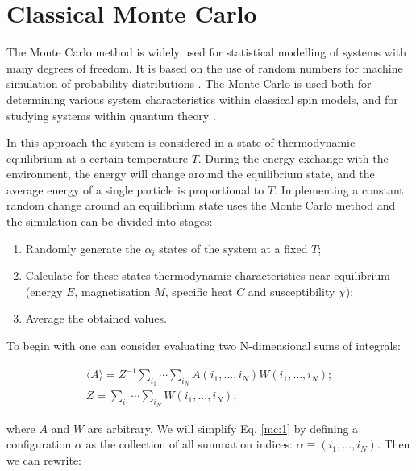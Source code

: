 \section{Classical Monte Carlo}
\label{monte-carlo}

The Monte Carlo method is widely used for statistical modelling of systems with many degrees of freedom. It is based on the use of random numbers for machine simulation of probability distributions \cite{janke}. The Monte Carlo is used both for determining various system characteristics within classical spin models, and for studying systems within quantum theory \cite{oliveira}.

In this approach the system is considered in a state of thermodynamic equilibrium at a certain temperature $T$. During the energy exchange with the environment, the energy will change around the equilibrium state, and the average energy of a single particle is proportional to $T$. Implementing a constant random change around an equilibrium state uses the Monte Carlo method and the simulation can be divided into stages:

\begin{enumerate}

    \item Randomly generate the $\alpha_i$ states of the system at a fixed $T$;
    
    \item Calculate for these states thermodynamic characteristics near equilibrium (energy $E$, magnetisation $M$, specific heat $C$ and susceptibility $\chi$);
    
    \item Average the obtained values.
    
\end{enumerate}


To begin with one can consider evaluating two N-dimensional sums of integrals:

\begin{equation}
	\label{mc:1}
	\begin{split}
		\langle A \rangle = Z^{-1} \sum_{i_1} \cdots \sum_{i_N} A \left( i_1, \dotsc, i_N \right) W \left( i_1, \dotsc, i_N \right);\\
		Z = \sum_{i_1} \cdots \sum_{i_N} W \left( i_1, \dotsc, i_N \right),
	\end{split}
\end{equation}

where $A$ and $W$ are arbitrary. We will simplify Eq. \ref{mc:1} by defining a configuration $\alpha$ as the collection of all summation indices: $\alpha \equiv \left( i_1, \dotsc, i_N \right)$. Then we can rewrite:

